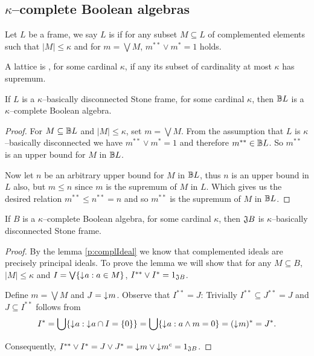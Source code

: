\subsection{$\kappa$--complete Boolean algebras}
\begin{definition}
    Let $L$ be a frame, we say $L$ is  if for any subset $M \subseteq L$ of complemented elements such that $|M| \leq \kappa$ and for $m = \bigvee M$, $m^{**} \vee m^* = 1$ holds.
\end{definition}

\begin{definition}
    A lattice is , for some cardinal $\kappa$, if any its subset of cardinality at most $\kappa$ has supremum.
\end{definition}

\begin{lemma}
    If $L$ is a $\kappa$--basically disconnected Stone frame, for some cardinal $\kappa$, then $\mathbb{B} L$ is a $\kappa$--complete Boolean algebra.
\end{lemma}
\begin{proof}
    For $M \subseteq \mathbb{B} L$ and $|M| \leq \kappa$, set $m = \bigvee M$. From the assumption that $L$ is $\kappa$--basically disconnected we have $m^{**} \vee m^* = 1$ and therefore $m^{**} \in \mathbb{B} L$. So $m^{**}$ is an upper bound for $M$ in $\mathbb{B} L$.

    Now let $n$ be an arbitrary upper bound for $M$ in $\mathbb{B} L$, thus $n$ is an upper bound in $L$ also, but $m \leq n$ since $m$ is the supremum of $M$ in $L$. Which gives us the desired relation $m^{**} \leq n^{**} = n$ and so $m^{**}$ is the supremum of $M$ in $\mathbb{B} L$.
\end{proof}

\begin{lemma}
    If $B$ is a $\kappa$--complete Boolean algebra, for some cardinal $\kappa$, then $\mathfrak{J} B$ is $\kappa$--basically disconnected Stone frame.
\end{lemma}
\begin{proof}
    By the lemma \ref{p:complIdeal} we know that complemented ideals are precisely principal ideals. To prove the lemma we will show that for any $M \subseteq B$, $|M| \leq \kappa$ and $I = \bigvee \{ \mathord{\downarrow}\mkern1mu a : a \in M \}$, $I^{**} \vee I^* = 1_{\mathfrak{J} B}$.

    Define $m = \bigvee M$ and $J = \mathord{\downarrow}\mkern1mu m$. Observe that $I^{**} = J$: Trivially $I^{**} \subseteq J^{**} = J$ and $J \subseteq I^{**}$ follows from
    $$ I^* = \bigcup \{ \mathord{\downarrow}\mkern1mu a : \mathord{\downarrow}\mkern1mu a \cap I = \{0\} \} = \bigcup \{ \mathord{\downarrow}\mkern1mu a : a \wedge m = 0 \} = (\mathord{\downarrow}\mkern1mu m)^* = J^*.$$

    Consequently, $I^{**} \vee I^* = J \vee J^* = \mathord{\downarrow}\mkern1mu m \vee \mathord{\downarrow}\mkern1mu m^c = 1_{\mathfrak{J} B}$.
\end{proof}

